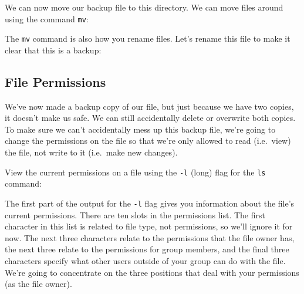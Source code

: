 \documentclass[
  letterpaper,
  DIV=11,
  numbers=noendperiod]{scrreprt}
\newenvironment{Shaded}{\begin{snugshade}}{\end{snugshade}}
\newcommand{\AttributeTok}[1]{\textcolor[rgb]{0.40,0.45,0.13}{#1}}
\newcommand{\ExtensionTok}[1]{\textcolor[rgb]{0.00,0.23,0.31}{#1}}
\newcommand{\NormalTok}[1]{\textcolor[rgb]{0.00,0.23,0.31}{#1}}
\newcommand{\PreprocessorTok}[1]{\textcolor[rgb]{0.68,0.00,0.00}{#1}}
\newcommand{\SpecialStringTok}[1]{\textcolor[rgb]{0.13,0.47,0.30}{#1}}
\begin{document}
We can now move our backup file to this directory. We can move files
around using the command \texttt{mv}:

\begin{Shaded}
\end{Shaded}

The \texttt{mv} command is also how you rename files. Let's rename this
file to make it clear that this is a backup:

\begin{Shaded}
\end{Shaded}

\subsection{File Permissions}\label{sec-file-permissions}

We've now made a backup copy of our file, but just because we have two
copies, it doesn't make us safe. We can still accidentally delete or
overwrite both copies. To make sure we can't accidentally mess up this
backup file, we're going to change the permissions on the file so that
we're only allowed to read (i.e.~view) the file, not write to it
(i.e.~make new changes).

View the current permissions on a file using the \texttt{-l} (long) flag
for the \texttt{ls} command:

\begin{Shaded}
\end{Shaded}

The first part of the output for the \texttt{-l} flag gives you
information about the file's current permissions. There are ten slots in
the permissions list. The first character in this list is related to
file type, not permissions, so we'll ignore it for now. The next three
characters relate to the permissions that the file owner has, the next
three relate to the permissions for group members, and the final three
characters specify what other users outside of your group can do with
the file. We're going to concentrate on the three positions that deal
with your permissions (as the file owner).
\end{document}
